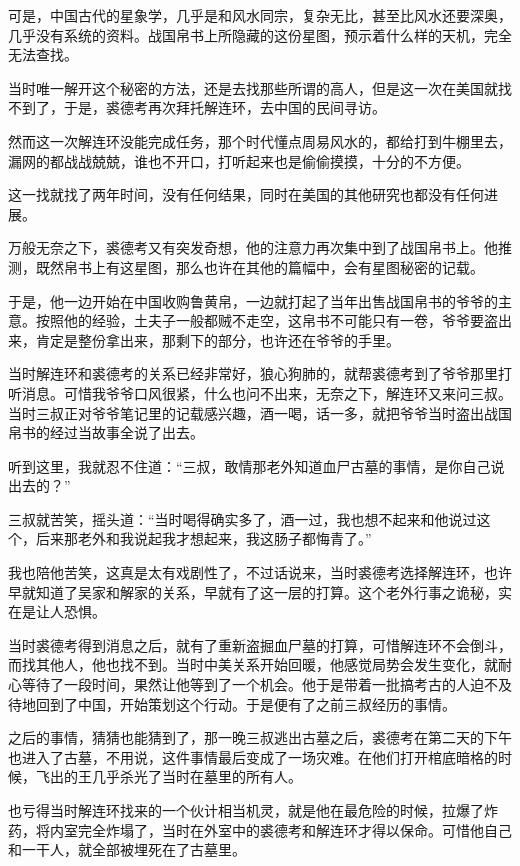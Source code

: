 可是，中国古代的星象学，几乎是和风水同宗，复杂无比，甚至比风水还要深奥，几乎没有系统的资料。战国帛书上所隐藏的这份星图，预示着什么样的天机，完全无法查找。

当时唯一解开这个秘密的方法，还是去找那些所谓的高人，但是这一次在美国就找不到了，于是，裘德考再次拜托解连环，去中国的民间寻访。

然而这一次解连环没能完成任务，那个时代懂点周易风水的，都给打到牛棚里去，漏网的都战战兢兢，谁也不开口，打听起来也是偷偷摸摸，十分的不方便。

这一找就找了两年时间，没有任何结果，同时在美国的其他研究也都没有任何进展。

万般无奈之下，裘德考又有突发奇想，他的注意力再次集中到了战国帛书上。他推测，既然帛书上有这星图，那么也许在其他的篇幅中，会有星图秘密的记载。

于是，他一边开始在中国收购鲁黄帛，一边就打起了当年出售战国帛书的爷爷的主意。按照他的经验，土夫子一般都贼不走空，这帛书不可能只有一卷，爷爷要盗出来，肯定是整份拿出来，那剩下的部分，也许还在爷爷的手里。

当时解连环和裘德考的关系已经非常好，狼心狗肺的，就帮裘德考到了爷爷那里打听消息。可惜我爷爷口风很紧，什么也问不出来，无奈之下，解连环又来问三叔。当时三叔正对爷爷笔记里的记载感兴趣，酒一喝，话一多，就把爷爷当时盗出战国帛书的经过当故事全说了出去。

听到这里，我就忍不住道：“三叔，敢情那老外知道血尸古墓的事情，是你自己说出去的？”

三叔就苦笑，摇头道：“当时喝得确实多了，酒一过，我也想不起来和他说过这个，后来那老外和我说起我才想起来，我这肠子都悔青了。”

我也陪他苦笑，这真是太有戏剧性了，不过话说来，当时裘德考选择解连环，也许早就知道了吴家和解家的关系，早就有了这一层的打算。这个老外行事之诡秘，实在是让人恐惧。

当时裘德考得到消息之后，就有了重新盗掘血尸墓的打算，可惜解连环不会倒斗，而找其他人，他也找不到。当时中美关系开始回暖，他感觉局势会发生变化，就耐心等待了一段时间，果然让他等到了一个机会。他于是带着一批搞考古的人迫不及待地回到了中国，开始策划这个行动。于是便有了之前三叔经历的事情。

之后的事情，猜猜也能猜到了，那一晚三叔逃出古墓之后，裘德考在第二天的下午也进入了古墓，不用说，这件事情最后变成了一场灾难。在他们打开棺底暗格的时候，飞出的王几乎杀光了当时在墓里的所有人。

也亏得当时解连环找来的一个伙计相当机灵，就是他在最危险的时候，拉爆了炸药，将内室完全炸塌了，当时在外室中的裘德考和解连环才得以保命。可惜他自己和一干人，就全部被埋死在了古墓里。

